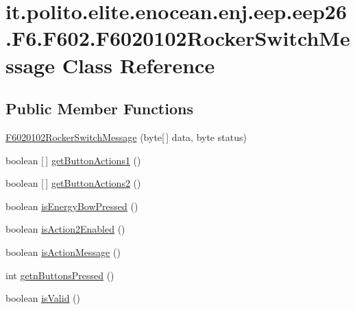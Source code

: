 \hypertarget{classit_1_1polito_1_1elite_1_1enocean_1_1enj_1_1eep_1_1eep26_1_1_f6_1_1_f602_1_1_f6020102_rocker_switch_message}{}\section{it.\+polito.\+elite.\+enocean.\+enj.\+eep.\+eep26.\+F6.\+F602.\+F6020102\+Rocker\+Switch\+Message Class Reference}
\label{classit_1_1polito_1_1elite_1_1enocean_1_1enj_1_1eep_1_1eep26_1_1_f6_1_1_f602_1_1_f6020102_rocker_switch_message}
\subsection*{Public Member Functions}
\begin{DoxyCompactItemize}
\item 
\hyperlink{classit_1_1polito_1_1elite_1_1enocean_1_1enj_1_1eep_1_1eep26_1_1_f6_1_1_f602_1_1_f6020102_rocker_switch_message_a6c0fc2abf1593e4da4b1b3c62d346c37}{F6020102\+Rocker\+Switch\+Message} (byte\mbox{[}$\,$\mbox{]} data, byte status)
\item 
boolean \mbox{[}$\,$\mbox{]} \hyperlink{classit_1_1polito_1_1elite_1_1enocean_1_1enj_1_1eep_1_1eep26_1_1_f6_1_1_f602_1_1_f6020102_rocker_switch_message_a29420a5f026af511a904e7ea08b31318}{get\+Button\+Actions1} ()
\item 
boolean \mbox{[}$\,$\mbox{]} \hyperlink{classit_1_1polito_1_1elite_1_1enocean_1_1enj_1_1eep_1_1eep26_1_1_f6_1_1_f602_1_1_f6020102_rocker_switch_message_aec5b9f2ae9cc61271452c8180b02887a}{get\+Button\+Actions2} ()
\item 
boolean \hyperlink{classit_1_1polito_1_1elite_1_1enocean_1_1enj_1_1eep_1_1eep26_1_1_f6_1_1_f602_1_1_f6020102_rocker_switch_message_ae2802c12d5d9d0a06e63d8f9923271d9}{is\+Energy\+Bow\+Pressed} ()
\item 
boolean \hyperlink{classit_1_1polito_1_1elite_1_1enocean_1_1enj_1_1eep_1_1eep26_1_1_f6_1_1_f602_1_1_f6020102_rocker_switch_message_afd05806608bf393a9c0650fdcdfe729e}{is\+Action2\+Enabled} ()
\item 
boolean \hyperlink{classit_1_1polito_1_1elite_1_1enocean_1_1enj_1_1eep_1_1eep26_1_1_f6_1_1_f602_1_1_f6020102_rocker_switch_message_acde559e98ea664dc99c25398ca703a9a}{is\+Action\+Message} ()
\item 
int \hyperlink{classit_1_1polito_1_1elite_1_1enocean_1_1enj_1_1eep_1_1eep26_1_1_f6_1_1_f602_1_1_f6020102_rocker_switch_message_a3b0dec325f3950e8f1814b1cadf827ad}{getn\+Buttons\+Pressed} ()
\item 
boolean \hyperlink{classit_1_1polito_1_1elite_1_1enocean_1_1enj_1_1eep_1_1eep26_1_1_f6_1_1_f602_1_1_f6020102_rocker_switch_message_a5f3d65339141bd7e6522114f6e91fb81}{is\+Valid} ()
\end{DoxyCompactItemize}


